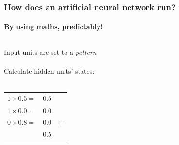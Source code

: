 \documentclass{beamer}
\begin{document}
\begin{frame}
\frametitle{How does an artificial neural network run?}
\framesubtitle{By using maths, predictably!}
  \begin{columns}[T]
    \begin{column}{.5\textwidth}
Input units are set to a \emph{pattern} \\
\ \\
Calculate hidden units' states: \\
\ \\
\begin{tabular}{r S[tabformat=3.2] r}%
 $1 \times 0.5 =$ & $0.5$ &\\
 $1 \times 0.0 =$ & $0.0$ &\\
 $0 \times 0.8 =$ & $0.0$ & +\\
 \hline
 & $0.5$ &
\end{tabular}


\end{column}
\end{columns}
\end{frame}
\end{document}
